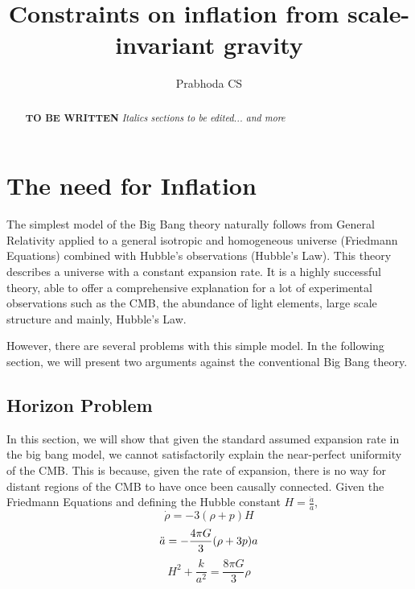 \documentclass[aps,prd,reprint,preprintnumbers,showpacs,floatfix,nofootinbib,superscript address]{revtex4-2}
\begin{document}
\title{Constraints on inflation from scale-invariant gravity}

\author{Prabhoda CS}

\begin{abstract}

\textbf{TO BE WRITTEN}
\textit{Italics sections to be edited... and more}
\end{abstract}

\maketitle


\section{The need for Inflation}\label{The need for Inflation}

\indent The simplest model of the Big Bang theory naturally follows from General Relativity applied to a general isotropic and homogeneous universe (Friedmann Equations) combined with Hubble's observations (Hubble's Law). This theory describes a universe with a constant expansion rate. It is a highly successful theory, able to offer a comprehensive explanation for a lot of experimental observations such as the CMB, the abundance of light elements, large scale structure and mainly, Hubble's Law.

However, there are several problems with this simple model. In the following section, we will present two arguments against the conventional Big Bang theory.

\subsection{Horizon Problem}
In this section, we will show that given the standard assumed expansion rate in the big bang model, we cannot satisfactorily explain the near-perfect uniformity of the CMB. This is because, given the rate of expansion, there is no way for distant regions of the CMB to have once been causally connected.
Given the Friedmann Equations and defining the Hubble constant $H = \frac{\dot{a}}{a}$,
\begin{equation} \label{1}
    \dot{\rho} = -3(\rho + p)H
\end{equation}
\begin{equation} \label{2}
    \Ddot{a} = -\frac{4\pi G}{3} (\rho + 3p)a
\end{equation}
\begin{equation}    \label{3}
    H^2 + \frac{k}{a^2} = \frac{8 \pi G}{3} \rho
\end{equation}
\end{document}
